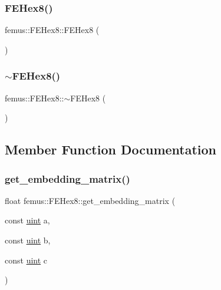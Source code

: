 \subsubsection{\texorpdfstring{F\+E\+Hex8()}{FEHex8()}}
{\footnotesize\ttfamily femus\+::\+F\+E\+Hex8\+::\+F\+E\+Hex8 (\begin{DoxyParamCaption}{ }\end{DoxyParamCaption})}

\mbox{\label{classfemus_1_1_f_e_hex8_a7133b27555c7c730281cc4c36ea2ac6d}} 
\subsubsection{\texorpdfstring{$\sim$\+F\+E\+Hex8()}{~FEHex8()}}
{\footnotesize\ttfamily femus\+::\+F\+E\+Hex8\+::$\sim$\+F\+E\+Hex8 (\begin{DoxyParamCaption}{ }\end{DoxyParamCaption})}



\subsection{Member Function Documentation}
\mbox{\label{classfemus_1_1_f_e_hex8_a6e1819ed6e7597f1109f3d314d1c1f1b}} 
\subsubsection{\texorpdfstring{get\+\_\+embedding\+\_\+matrix()}{get\_embedding\_matrix()}}
{\footnotesize\ttfamily float femus\+::\+F\+E\+Hex8\+::get\+\_\+embedding\+\_\+matrix (\begin{DoxyParamCaption}\item[{const \mbox{\hyperlink{_typedefs_8hpp_a91ad9478d81a7aaf2593e8d9c3d06a14}{uint}}}]{a,  }\item[{const \mbox{\hyperlink{_typedefs_8hpp_a91ad9478d81a7aaf2593e8d9c3d06a14}{uint}}}]{b,  }\item[{const \mbox{\hyperlink{_typedefs_8hpp_a91ad9478d81a7aaf2593e8d9c3d06a14}{uint}}}]{c }\end{DoxyParamCaption})\hspace{0.3cm}{\ttfamily [virtual]}}



